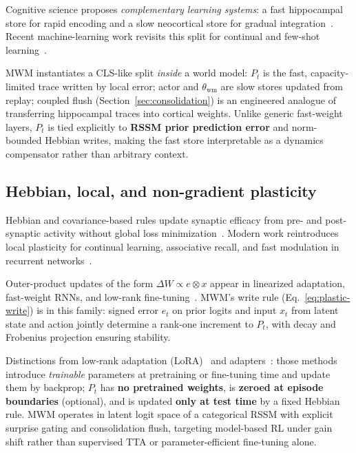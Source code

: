 Cognitive science proposes \emph{complementary learning systems}: a fast hippocampal store for rapid encoding and a slow neocortical store for gradual integration~\cite{mcclelland1995complementary,kumaran2016learning}.
Recent machine-learning work revisits this split for continual and few-shot learning~\cite{ritter2018been,hung2019optimizing}.

MWM instantiates a CLS-like split \emph{inside} a world model:
$P_t$ is the fast, capacity-limited trace written by local error;
actor and $\theta_{\mathrm{wm}}$ are slow stores updated from replay;
coupled flush (Section~\ref{sec:consolidation}) is an engineered analogue of transferring hippocampal traces into cortical weights.
Unlike generic fast-weight layers, $P_t$ is tied explicitly to \textbf{RSSM prior prediction error} and norm-bounded Hebbian writes, making the fast store interpretable as a dynamics compensator rather than arbitrary context.

\subsection{Hebbian, local, and non-gradient plasticity}
\label{sec:related-hebbian}

Hebbian and covariance-based rules update synaptic efficacy from pre- and post-synaptic activity without global loss minimization~\cite{hebb1949organization,bienenstock1982theory}.
Modern work reintroduces local plasticity for continual learning, associative recall, and fast modulation in recurrent networks~\cite{ba2016using,mallya2018piggyback}.

Outer-product updates of the form $\Delta W \propto e \otimes x$ appear in linearized adaptation, fast-weight RNNs, and low-rank fine-tuning~\cite{hu2022lora}.
MWM's write rule (Eq.~\eqref{eq:plastic-write}) is in this family: signed error $e_t$ on prior logits and input $x_t$ from latent state and action jointly determine a rank-one increment to $P_t$, with decay and Frobenius projection ensuring stability.

Distinctions from low-rank adaptation (LoRA)~\cite{hu2022lora} and adapters~\cite{houlsby2019parameter}:
those methods introduce \emph{trainable} parameters at pretraining or fine-tuning time and update them by backprop;
$P_t$ has \textbf{no pretrained weights}, is \textbf{zeroed at episode boundaries} (optional), and is updated \textbf{only at test time} by a fixed Hebbian rule.
MWM operates in latent logit space of a categorical RSSM with explicit surprise gating and consolidation flush, targeting model-based RL under gain shift rather than supervised TTA or parameter-efficient fine-tuning alone.

